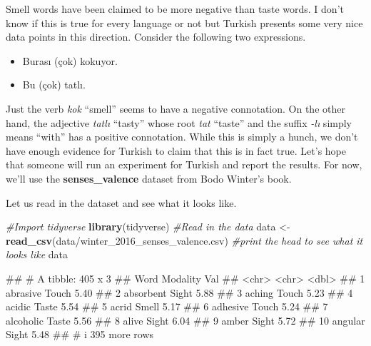 \documentclass[
]{book}
\newenvironment{Shaded}{\begin{snugshade}}{\end{snugshade}}
\newcommand{\CommentTok}[1]{\textcolor[rgb]{0.56,0.35,0.01}{\textit{#1}}}
\newcommand{\FunctionTok}[1]{\textcolor[rgb]{0.13,0.29,0.53}{\textbf{#1}}}
\newcommand{\NormalTok}[1]{#1}
\newcommand{\OtherTok}[1]{\textcolor[rgb]{0.56,0.35,0.01}{#1}}
\newcommand{\StringTok}[1]{\textcolor[rgb]{0.31,0.60,0.02}{#1}}
\providecommand{\tightlist}{%
  \setlength{\itemsep}{0pt}\setlength{\parskip}{0pt}}
\begin{document}
Smell words have been claimed to be more negative than taste words. I don't know if this is true for every language or not but Turkish presents some very nice data points in this direction. Consider the following two expressions.

\begin{itemize}
\tightlist
\item
  Burası (çok) kokuyor.
\item
  Bu (çok) tatlı.
\end{itemize}

Just the verb \emph{kok} ``smell'' seems to have a negative connotation. On the other hand, the adjective \emph{tatlı} ``tasty'' whose root \emph{tat} ``taste'' and the suffix \emph{-lı} simply means ``with'' has a positive connotation. While this is simply a hunch, we don't have enough evidence for Turkish to claim that this is in fact true. Let's hope that someone will run an experiment for Turkish and report the results. For now, we'll use the \textbf{senses\_valence} dataset from Bodo Winter's book.

Let us read in the dataset and see what it looks like.

\begin{Shaded}
\begin{Highlighting}[]
\CommentTok{\#Import tidyverse}
\FunctionTok{library}\NormalTok{(tidyverse)}
\CommentTok{\#Read in the data}
\NormalTok{data }\OtherTok{\textless{}{-}} \FunctionTok{read\_csv}\NormalTok{(}\StringTok{\textquotesingle{}data/winter\_2016\_senses\_valence.csv\textquotesingle{}}\NormalTok{)}
\CommentTok{\#print the head to see what it looks like}
\NormalTok{data}
\end{Highlighting}
\end{Shaded}

\begin{Shaded}
\begin{Highlighting}[]
\NormalTok{\#\# \# A tibble: 405 x 3}
\NormalTok{\#\#    Word      Modality   Val}
\NormalTok{\#\#    \textless{}chr\textgreater{}     \textless{}chr\textgreater{}    \textless{}dbl\textgreater{}}
\NormalTok{\#\#  1 abrasive  Touch     5.40}
\NormalTok{\#\#  2 absorbent Sight     5.88}
\NormalTok{\#\#  3 aching    Touch     5.23}
\NormalTok{\#\#  4 acidic    Taste     5.54}
\NormalTok{\#\#  5 acrid     Smell     5.17}
\NormalTok{\#\#  6 adhesive  Touch     5.24}
\NormalTok{\#\#  7 alcoholic Taste     5.56}
\NormalTok{\#\#  8 alive     Sight     6.04}
\NormalTok{\#\#  9 amber     Sight     5.72}
\NormalTok{\#\# 10 angular   Sight     5.48}
\NormalTok{\#\# \# i 395 more rows}
\end{Highlighting}
\end{Shaded}
\end{document}
